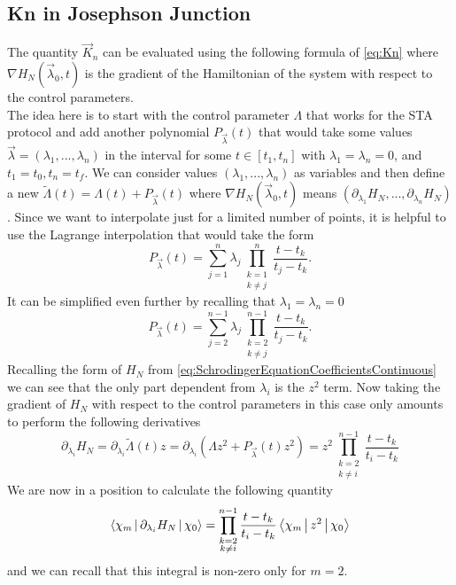 \documentclass{article}
\begin{document}
\subsection{Kn in Josephson Junction}
The quantity $ \vec{ K }_{n} $ can be evaluated using the following formula of \cref{eq:Kn} where $ \nabla H_{N}(\vec{ \lambda }_{0}, t)$ is the gradient of the Hamiltonian of the system with respect to the control parameters.\\
The idea here is to start with the control parameter $ \Lambda $ that works for the STA protocol and add another polynomial $ P_{\vec{\lambda}}(t) $ that would take some values $ \vec{\lambda}  = (\lambda_{1},..., \lambda_{n})$ in the interval for some $ t \in [t_1, t_{n}] $ with $ \lambda_{1} = \lambda_{n} = 0 $, and $ t_{1}  = t_0 , t_{n} = t_{f} $.
We can consider values $ (\lambda_{1},..., \lambda_n) $ as variables and then define a new $ \tilde{\Lambda}(t) = \Lambda(t) +   P_{\vec{\lambda}}(t) $ where $ \nabla H_{N}(\vec{\lambda}_0,t) $ means $ (\partial_{\lambda_1} H_{N},..., \partial_{\lambda_n} H_{N}) $.
Since we want to interpolate just for a limited number of points, it is helpful to use the Lagrange interpolation that would take the form
\begin{equation}
	\label{eq:LagrangeInterpolationPolynomial}
	P_{\vec{ \lambda }}(t) = \sum_{j=1}^{n}\lambda_{j}\prod_{\substack{k=1\\k\neq j }}^{n}\frac{t-t_{k}}{t_{j} - t_{k}}.
\end{equation}
It can be simplified even further by recalling that $ \lambda_{1} = \lambda_{n} = 0 $
\begin{equation}
	\label{eq:LagrangeInterpolationPolynomialSimplified}
	P_{\vec{ \lambda }}(t) = \sum_{j=2}^{n-1}\lambda_{j}\prod_{\substack{k=2\\k\neq j }}^{n-1}\frac{t-t_{k}}{t_{j} - t_{k}}.
\end{equation}
Recalling the form of $   H_{N} $ from \cref{eq:SchrodingerEquationCoefficientsContinuous} we can see that the only part dependent from $ \lambda_{i} $ is the $ z^2 $ term.
Now taking the gradient of $ H_{N} $ with respect to the control parameters in this case only amounts to perform the following derivatives
\begin{equation}
	\label{eq:GradientLambda}
	\partial_{\lambda_i} H_{N}=\partial_{\lambda_i} \tilde{ \Lambda }(t)z = \partial_{\lambda_i} \left(\Lambda z^2 + P_{\vec{ \lambda }}(t)z^2    \right) =z^2\prod_{\substack{k=2\\k\neq i }}^{n-1}\frac{t-t_{k}}{t_{i} - t_{k}}
\end{equation}
We are now in a position to calculate the following quantity
\begin{equation}
	\label{eq:KnOverSpace}
	\Braket{\chi_{m}|\partial_{\lambda_i} H_{N}|\chi_{0}} = \prod_{\substack{k=2\\k\neq i }}^{n-1}\frac{t-t_{k}}{t_{i} - t_{k}} \Braket{\chi_{m}|z^2 |\chi_{0}}
\end{equation}
and we can recall that this integral is non-zero only for $ m = 2 $.
\end{document}
